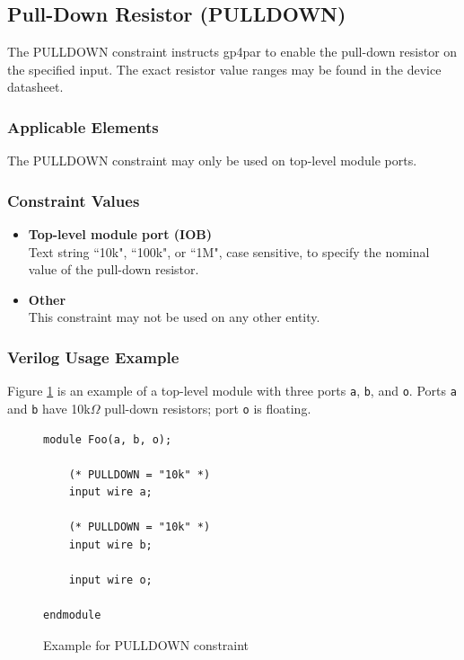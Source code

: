\documentclass{article}
\begin{document}

\pagebreak
\subsection{Pull-Down Resistor (PULLDOWN)}

The PULLDOWN constraint instructs gp4par to enable the pull-down resistor on the specified input. The exact resistor 
value ranges may be found in the device datasheet.

\subsubsection{Applicable Elements}
The PULLDOWN constraint may only be used on top-level module ports. 

\subsubsection{Constraint Values}
\begin{itemize}
\item {\bfseries Top-level module port (IOB)}\\
Text string ``10k", ``100k", or ``1M", case sensitive, to specify the nominal value of the pull-down resistor.
\item {\bfseries Other} \\
This constraint may not be used on any other entity.
\end{itemize}

\subsubsection{Verilog Usage Example}

Figure \ref{constraint-pulldown} is an example of a top-level module with three ports \texttt{a}, \texttt{b}, and
\texttt{o}. Ports \texttt{a} and \texttt{b} have 10k$\Omega$ pull-down resistors; port \texttt{o} is floating.

\begin{figure}[h]
\begin{lstlisting}
module Foo(a, b, o);

	(* PULLDOWN = "10k" *)
	input wire a;

	(* PULLDOWN = "10k" *)
	input wire b;

	input wire o;
	
endmodule
\end{lstlisting}
\caption{Example for PULLDOWN constraint}
\label{constraint-pulldown}
\end{figure}
\end{document}
